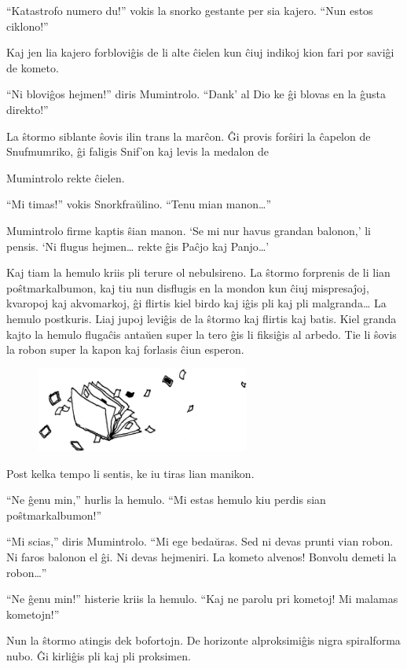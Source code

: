``Katastrofo numero du!'' vokis la snorko gestante per sia kajero. ``Nun estos ciklono!''

Kaj jen lia kajero forbloviĝis de li alte ĉielen kun ĉiuj indikoj kion fari por saviĝi de kometo.

``Ni bloviĝos hejmen!'' diris Mumintrolo. ``Dank' al Dio ke ĝi blovas en la ĝusta direkto!''

La ŝtormo siblante ŝovis ilin trans la marĉon. Ĝi provis forŝiri la ĉapelon de Snufmumriko, ĝi faligis Snif'on kaj levis la medalon de

Mumintrolo rekte ĉielen.

``Mi timas!'' vokis Snorkfraŭlino. ``Tenu mian manon{\ldots}''

Mumintrolo firme kaptis ŝian manon. `Se mi nur havus grandan balonon,' li pensis. `Ni flugus hejmen{\ldots} rekte ĝis Paĉjo kaj Panjo{\ldots}'

Kaj tiam la hemulo kriis pli terure ol nebulsireno. La ŝtormo forprenis de li lian poŝtmarkalbumon, kaj tiu nun disflugis en la mondon kun ĉiuj mispresaĵoj, kvaropoj kaj akvomarkoj, ĝi flirtis kiel birdo kaj iĝis pli kaj pli malgranda{\ldots} La hemulo postkuris. Liaj jupoj leviĝis de la ŝtormo kaj flirtis kaj batis. Kiel granda kajto la hemulo flugaĉis antaŭen super la tero ĝis li fiksiĝis al arbedo. Tie li ŝovis la robon super la kapon kaj forlasis ĉiun esperon.

\begin{figure}[htbp]
\centering
\includegraphics[width=200pt,height=79pt]{8-7.png}
\caption{}
\label{8-7}
\end{figure}

Post kelka tempo li sentis, ke iu tiras lian manikon.

``Ne ĝenu min,'' hurlis la hemulo. ``Mi estas hemulo kiu perdis sian poŝtmarkalbumon!''

``Mi scias,'' diris Mumintrolo. ``Mi ege bedaŭras. Sed ni devas prunti vian robon. Ni faros balonon el ĝi. Ni devas hejmeniri. La kometo alvenos! Bonvolu demeti la robon{\ldots}''

``Ne ĝenu min!'' histerie kriis la hemulo. ``Kaj ne parolu pri kometoj! Mi malamas kometojn!''

Nun la ŝtormo atingis dek bofortojn. De horizonte alproksimiĝis nigra spiralforma nubo. Ĝi kirliĝis pli kaj pli proksimen.

